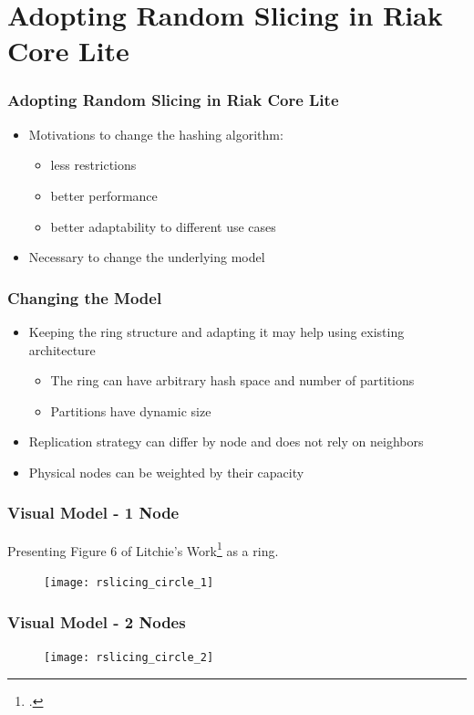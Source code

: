 \documentclass[aspectratio=169]{beamer}
\begin{document}
\section{Adopting Random Slicing in Riak Core Lite}
\begin{frame}
\frametitle{Adopting Random Slicing in Riak Core Lite}
\begin{itemize}
\item Motivations to change the hashing algorithm:
\begin{itemize}
\item less restrictions
\item better performance
\item better adaptability to different use cases
\end{itemize}
\item Necessary to change the underlying model
\end{itemize}
\end{frame}

\begin{frame}
\frametitle{Changing the Model}
\begin{itemize}
\item Keeping the ring structure and adapting it may help using existing architecture
\begin{itemize}
\item The ring can have arbitrary hash space and number of partitions
\item Partitions have dynamic size
\end{itemize}
\item Replication strategy can differ by node and does not rely on neighbors
\item Physical nodes can be weighted by their capacity
\end{itemize}
\end{frame}

\begin{frame}
\frametitle{Visual Model - 1 Node}
Presenting Figure 6 of Litchie's Work\footcite{Fritchie2018} as a ring.
\begin{figure}
\texttt{[image: rslicing\_circle\_1]}
\end{figure}
\end{frame}

\begin{frame}
\frametitle{Visual Model - 2 Nodes}
\begin{figure}
\texttt{[image: rslicing\_circle\_2]}
\end{figure}
\end{frame}
\end{document}
